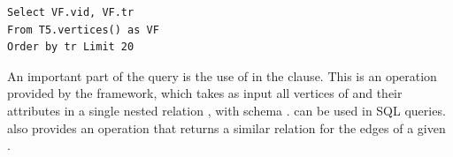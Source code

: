 \begin{small}
\begin{verbatim}
Select VF.vid, VF.tr
From T5.vertices() as VF
Order by tr Limit 20
\end{verbatim}
\end{small}

An important part of the query is the use of  in
the  clause. This is an operation provided by the \sys
framework, which takes as input all vertices of  and their
attributes in a single nested relation , with schema
.  can be
used in SQL queries. \sys also provides an operation 
that returns a similar relation for the edges of a given \tg.




